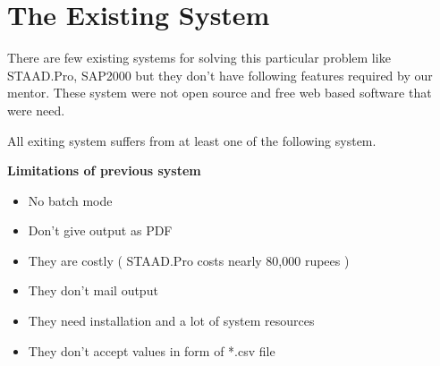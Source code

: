 \section{The Existing System}
There are few existing systems for solving this particular problem like STAAD.Pro, SAP2000 but they don't have
following features required by our mentor. These system were not open source and free web based software 
that were need.


All exiting system suffers from at least one of the following system.  



{\bf {Limitations of previous system }}
\begin{itemize}
\item No batch mode 

\item Don't give output as PDF

\item They are costly ( STAAD.Pro costs nearly 80,000 rupees )

\item They don't mail output 

\item They need installation and a lot of system resources 

\item They don't accept values in form of *.csv file 
\end{itemize}


